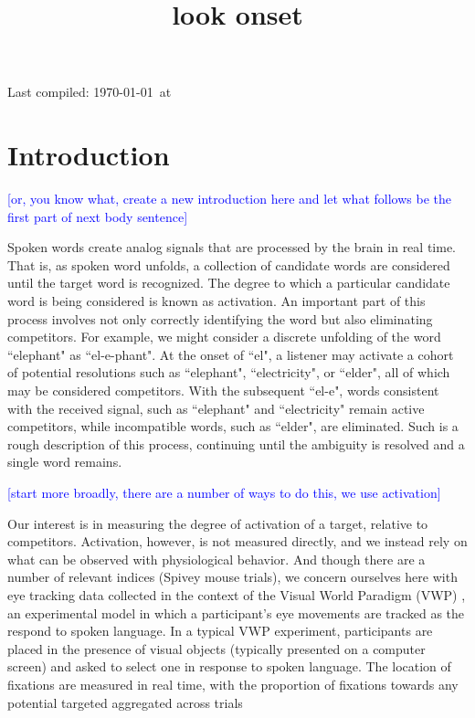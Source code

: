 \documentclass{article}
\title{look onset}
\date{}
\providecommand{\cn}[1]{\textcolor{blue}{#1}}
\begin{document}

\maketitle

Last compiled: \today \  at \currenttime

%




\section{Introduction}

\cn{[or, you know what, create a new introduction here and let what follows be the first part of next body sentence]}

Spoken words create analog signals that are processed by the brain in real time. That is, as spoken word unfolds, a collection of candidate words are considered until the target word is recognized. The degree to which a particular candidate word is being considered is known as activation. An important part of this process involves not only correctly identifying the word but also eliminating competitors. For example, we might consider a discrete unfolding of the word ``elephant" as ``el-e-phant". At the onset of ``el", a listener may activate a cohort of potential resolutions such as ``elephant", ``electricity", or ``elder", all of which may be considered competitors. With the subsequent ``el-e", words consistent with the received signal, such as ``elephant" and ``electricity" remain active competitors, while incompatible words, such as ``elder", are eliminated. Such is a rough description of this process, continuing until the ambiguity is resolved and a single word remains.



\cn{[start more broadly, there are a number of ways to do this, we use activation]}

Our interest is in measuring the degree of activation of a target, relative to competitors. Activation, however, is not measured directly, and we instead rely on what can be observed with physiological behavior. And though there are a number of relevant indices (Spivey mouse trials), we concern ourselves here with eye tracking data collected in the context of the Visual World Paradigm (VWP) \cite{tanenhaus1995integration}, an experimental model in which a participant's eye movements are tracked as the respond to spoken language. In a typical VWP experiment, participants are placed in the presence of visual objects (typically presented on a computer screen) and asked to select one in response to spoken language. The location of fixations are measured in real time, with the proportion of fixations towards any potential targeted aggregated across trials
\end{document}
